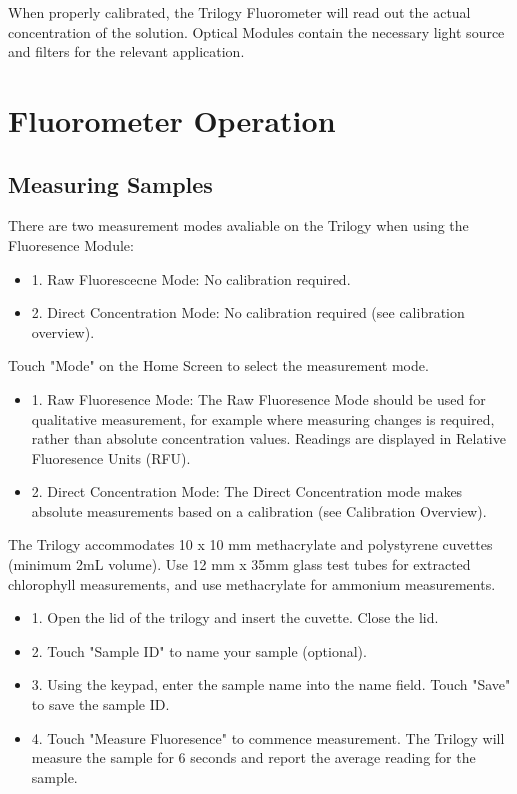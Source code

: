 \documentclass[12pt]{../SOP3_beta}
\begin{document}
\NP When properly calibrated, the Trilogy Fluorometer will read out the actual concentration of the solution. Optical Modules contain the necessary light source and filters for the relevant application. 

\section{Fluorometer Operation}
\subsection{Measuring Samples}
\NP There are two measurement modes avaliable on the Trilogy when using the Fluoresence Module:
\begin{itemize}
  \item 1. Raw Fluorescecne Mode: No calibration required.
  \item 2. Direct Concentration Mode: No calibration required (see calibration overview).
\end{itemize}
\NP Touch "Mode" on the Home Screen to select the measurement mode.
\begin{itemize}
  \item 1. Raw Fluoresence Mode: The Raw Fluoresence Mode should be used for qualitative measurement, for example where measuring changes is required, rather than absolute concentration values. Readings are displayed in Relative Fluoresence Units (RFU).
  \item 2. Direct Concentration Mode: The Direct Concentration mode makes absolute measurements based on a calibration (see Calibration Overview).
\end{itemize}

\NP The Trilogy accommodates 10 x 10 mm methacrylate and polystyrene cuvettes (minimum 2mL volume). Use 12 mm x 35mm glass test tubes for extracted chlorophyll measurements, and use methacrylate for ammonium measurements.
\begin{itemize}
  \item 1. Open the lid of the trilogy and insert the cuvette. Close the lid.
  \item 2. Touch "Sample ID" to name your sample (optional).
  \item 3. Using the keypad, enter the sample name into the name field. Touch "Save" to save the sample ID.
  \item 4. Touch "Measure Fluoresence" to commence measurement. The Trilogy will measure the sample for 6 seconds and report the average reading for the sample. 
\end{itemize}
\end{document}
